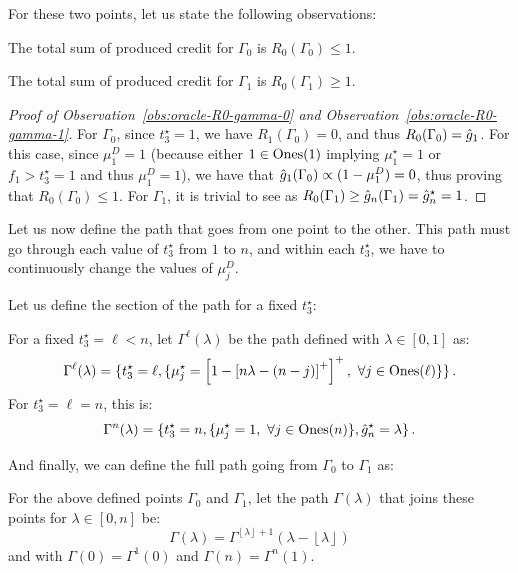 For these two points, let us state the following observations:
\begin{observation}\label{obs:oracle-R0-gamma-0}
    The total sum of produced credit for $\Gamma_0$ is $R_0(\Gamma_0)\leq 1$.
\end{observation}
\begin{observation}\label{obs:oracle-R0-gamma-1}
    The total sum of produced credit for $\Gamma_1$ is $R_0(\Gamma_1)\geq 1$.
\end{observation}
\begin{proof}[Proof of Observation~\ref{obs:oracle-R0-gamma-0} and Observation~\ref{obs:oracle-R0-gamma-1}]
    For $\Gamma_0$, since $t_3^\star=1$, we have $R_1(\Gamma_0)=0$, and thus $R_0(\Gamma_0)=\hat{g}_1$. For this case, since $\mu_1^D=1$ (because either $1\in\text{Ones}(1)$ implying $\mu_1^\star=1$ or $f_1>t_3^\star=1$ and thus $\mu_1^D=1$), we have that $\hat{g}_1(\Gamma_0)\propto (1-\mu_1^D)=0$, thus proving that $R_0(\Gamma_0)\leq 1$. For $\Gamma_1$, it is trivial to see as $R_0(\Gamma_1) \geq \hat{g}_n(\Gamma_1) = \hat{g}_n^\star = 1$.
\end{proof}

Let us now define the path that goes from one point to the other. This path must go through each value of $t_3^\star$ from $1$ to $n$, and within each $t_3^\star$, we have to continuously change the values of $\mu_j^D$. 

Let us define the section of the path for a fixed $t_3^\star$:
\begin{definition}
    For a fixed $t_3^\star=\ell < n$, let $\Gamma^{\ell}(\lambda)$ be the path defined with $\lambda\in[0,1]$ as:
    \begin{equation*}
        \Gamma^{\ell}(\lambda) = \{t_3^\star=\ell, \{\mu_j^\star=\left[1-\left[n\lambda - (n-j)\right]^+\right]^+, \ \forall j\in \text{Ones}(\ell) \}\}\,.
    \end{equation*}
    For $t_3^\star=\ell=n$, this is:
    \begin{equation*}
        \Gamma^{n}(\lambda) = \{t_3^\star=n, \{\mu_j^\star=1, \ \forall j\in \text{Ones}(n) \}, \hat{g}_n^\star = \lambda\}\,.
    \end{equation*}
\end{definition}
And finally, we can define the full path going from $\Gamma_0$ to $\Gamma_1$ as:
\begin{definition}
    For the above defined points $\Gamma_0$ and $\Gamma_1$, let the path $\Gamma(\lambda)$ that joins these points for $\lambda\in[0,n]$ be:
    \begin{equation*}
        \Gamma(\lambda) = \Gamma^{\left\lfloor\lambda\right\rfloor + 1}\left(\lambda - \left\lfloor\lambda\right\rfloor\right)
    \end{equation*}
    and with $\Gamma(0) = \Gamma^1(0)$ and $\Gamma(n) = \Gamma^n(1)$.
\end{definition}


